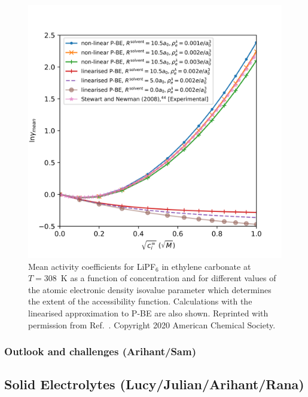 \documentclass[../main.tex]{subfiles}
\begin{document}
\begin{figure}
    \includegraphics[scale=0.8]{figures/lipf6.png}
    \caption{Mean activity coefficients for LiPF$_6$ in ethylene carbonate at $T=308$~K as a function of concentration and for different values of the atomic electronic density isovalue parameter which determines the extent of the accessibility function. Calculations with the linearised approximation to P-BE are also shown. Reprinted with permission from Ref.~. Copyright 2020 American Chemical Society.}
    \label{fig:ac}
\end{figure}
    
\subsubsection{Outlook and challenges (Arihant/Sam)}

\subsection{Solid Electrolytes (Lucy/Julian/Arihant/Rana)}
\label{sec:solid_electrolytes}
\end{document}
